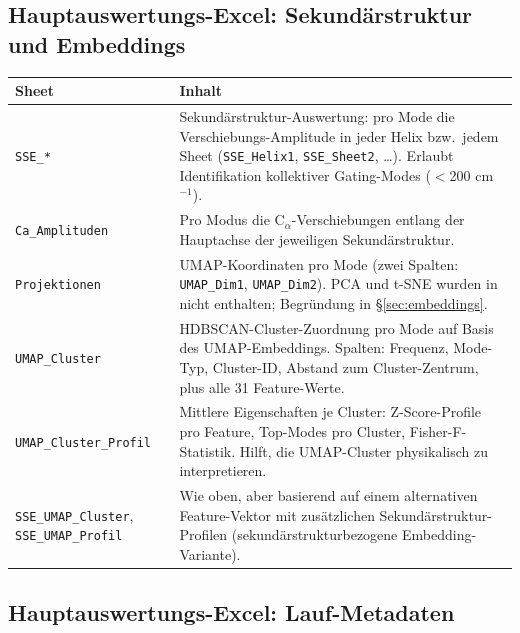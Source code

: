 \documentclass[11pt,a4paper,twoside]{article}
\theoremstyle{remark}
\begin{document}
\subsection{Hauptauswertungs-Excel: Sekund\"arstruktur und Embeddings}

\begin{longtable}{p{} p{}}
\toprule
\textbf{Sheet} & \textbf{Inhalt} \\
\midrule
\endhead

\texttt{SSE\_*} & Sekund\"arstruktur-Auswertung: pro Mode die
  Verschiebungs-Amplitude in jeder Helix bzw.\ jedem Sheet
  (\texttt{SSE\_Helix1}, \texttt{SSE\_Sheet2}, \ldots). Erlaubt
  Identifikation kollektiver Gating-Modes ($<$200 cm$^{-1}$). \\

\texttt{Ca\_Amplituden} & Pro Modus die C$_\alpha$-Verschiebungen
  entlang der Hauptachse der jeweiligen Sekund\"arstruktur. \\

\texttt{Projektionen} & UMAP-Koordinaten pro Mode (zwei Spalten:
  \texttt{UMAP\_Dim1}, \texttt{UMAP\_Dim2}). PCA und t-SNE wurden in
  nicht enthalten; Begr\"undung in \S\ref{sec:embeddings}. \\

\texttt{UMAP\_Cluster} & HDBSCAN-Cluster-Zuordnung pro Mode auf
  Basis des UMAP-Embeddings. Spalten: Frequenz, Mode-Typ,
  Cluster-ID, Abstand zum Cluster-Zentrum, plus alle 31
  Feature-Werte. \\

\texttt{UMAP\_Cluster\_Profil} & Mittlere Eigenschaften je Cluster:
  Z-Score-Profile pro Feature, Top-Modes pro Cluster, Fisher-F-
  Statistik. Hilft, die UMAP-Cluster physikalisch zu interpretieren. \\

\texttt{SSE\_UMAP\_Cluster}, \texttt{SSE\_UMAP\_Profil} & Wie oben, aber
  basierend auf einem alternativen Feature-Vektor mit zus\"atzlichen
  Sekund\"arstruktur-Profilen (sekund\"arstrukturbezogene Embedding-
  Variante). \\
\bottomrule
\end{longtable}

\subsection{Hauptauswertungs-Excel: Lauf-Metadaten}
\end{document}
